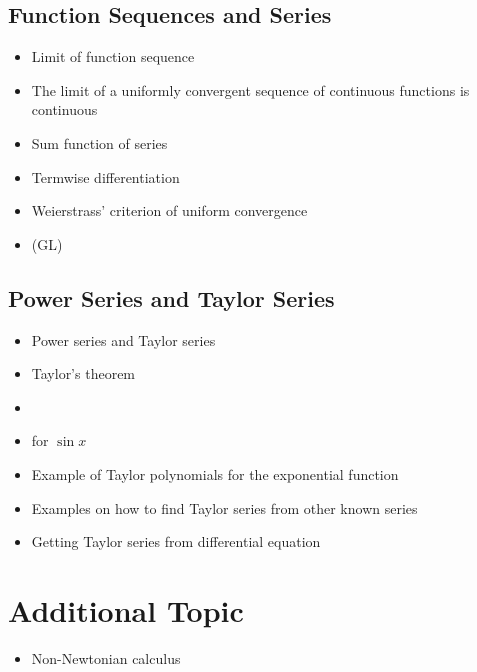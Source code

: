 \documentclass[12pt]{article}
\theoremstyle{definition}
\begin{document}
\subsection{Function Sequences and Series}
\begin{itemize}
\item Limit of function sequence
\item The limit of a uniformly convergent sequence of continuous functions is continuous
\item Sum function of series
\item Termwise differentiation
\item Weierstrass' criterion of uniform convergence
\item (GL) 
\end{itemize}


\subsection{Power Series and Taylor Series}
\begin{itemize}
\item Power series and Taylor series
\item Taylor's theorem
\item {}
\item {} for $\sin x$
\item Example of Taylor polynomials for the exponential function
\item Examples on how to find Taylor series from other known series
\item Getting Taylor series from differential equation
\end{itemize}


\section{Additional Topic}
\begin{itemize}
\item Non-Newtonian calculus
\end{itemize}
\end{document}
